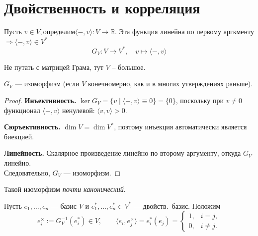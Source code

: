 \section{Двойственность и корреляция}

\begin{definition}
    Пусть $v \in V,  \text{определим} \langle -, v\rangle: V \rightarrow \mathbb{R}$.
    Эта функция линейна по первому аргкменту $\Rightarrow \langle -, v\rangle \in V^*$
    \[
    G_V \colon V \to V^*, \quad v \mapsto \langle-, v\rangle
    \]
\end{definition}

\begin{remark}
    Не путать с матрицей Грама, тут $V$ -- большое.
\end{remark}

\begin{stmt}
    $G_V$ --- изоморфизм (если $V$ конечномерно, как и в многих утверждениях раньше).
    \begin{proof}
        \textbf{Инъективность.} $\ker G_V = \{v \mid \langle -, v \rangle \equiv 0\} = \{0\}$,
        поскольку при $v \neq 0$ функционал $\langle -, v \rangle$ ненулевой:
        $\langle v, v \rangle > 0$.

        \textbf{Сюръективность.} $\dim V = \dim V^*$, поэтому инъекция автоматически является биекцией.

        \textbf{Линейность.} Скалярное произведение линейно по второму аргументу,
        откуда $G_V$ линейно. \\ Следовательно, $G_V$ --- изоморфизм.
    \end{proof}

\end{stmt}

\begin{remark}
    Такой изоморфизм \textit{почти канонический}.
\end{remark}

\begin{definition}
    Пусть $e_1, \dots, e_n$ — базис $V$ и $e_1^*, \dots, e_n^* \in V^*$ — двойств.\ базис.
    Положим
    \[
        e_i^\times := G_V^{-1}(e_i^*) \in V, \qquad
        \langle e_i, e_j^\times \rangle = e_i^*(e_j) = \begin{cases} 1, & i = j, \\ 0, & i \neq j. \end{cases}
    \]

\end{definition}

